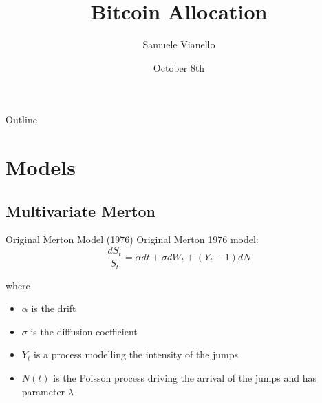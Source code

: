 \documentclass{beamer}
\title[Your Short Title]{Bitcoin Allocation}
\author{Samuele Vianello}
\date{October 8th}
\begin{document}
\begin{frame}
  \titlepage
\end{frame}

\begin{frame}{Outline}
  \tableofcontents
\end{frame}


%
%

%

\section{Models}

\subsection{Multivariate Merton}

\begin{frame}{Original Merton Model (1976)}
Original Merton 1976 model:
\begin{equation}
\label{merton_model}
    \frac{dS_t}{S_t} = \alpha dt + \sigma dW_t  + (Y_t-1)dN
\end{equation}

where 
\begin{itemize}
    \item $\alpha$ is the drift
    \item $\sigma$ is the diffusion coefficient
    \item $Y_t$ is a process modelling the intensity of the jumps
    \item $N(t)$ is the Poisson process driving the arrival of the jumps and has parameter $\lambda$
\end{itemize}

\end{frame}
\end{document}
